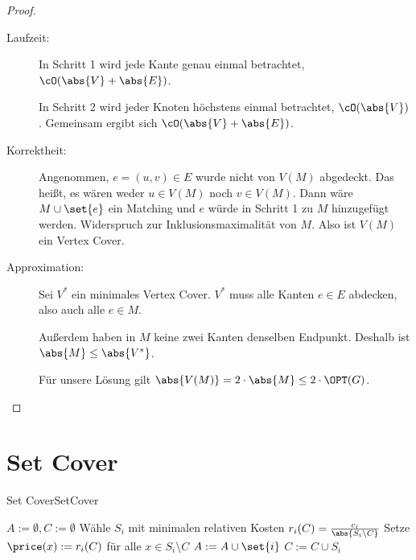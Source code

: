 \documentclass[language=ngerman,algolist]{TemplateLecture}
\begin{document}
\begin{proof}
    \begin{description}
        \item[Laufzeit:] In Schritt 1 wird jede Kante genau einmal betrachtet, $\cO(\abs{V} + \abs{E})$. 
        
        In Schritt 2 wird jeder Knoten höchstens einmal betrachtet, $\cO(\abs{V})$. Gemeinsam ergibt sich $\cO(\abs{V} + \abs{E})$.
        \item[Korrektheit:] Angenommen, $e = (u,v) \in E$ wurde nicht von $V(M)$ abgedeckt. Das heißt, es wären weder $u \in V(M)$ noch $v \in V(M)$. Dann wäre $M \cup \set{e}$ ein Matching und $e$ würde in Schritt 1 zu $M$ hinzugefügt werden. Widerspruch zur Inklusionsmaximalität von $M$. Also ist $V(M)$ ein Vertex Cover.
        \item[Approximation:] Sei $V^*$ ein minimales Vertex Cover. $V^*$ muss alle Kanten $e \in E$ abdecken, also auch alle $e \in M$. 
        
        Außerdem haben in $M$ keine zwei Kanten denselben Endpunkt. Deshalb ist $\abs{M} \leq \abs{V^*}$. 
        
        Für unsere Lösung gilt $\abs{V(M)} = 2 \cdot \abs{M} \leq 2 \cdot \OPT(G)$.
    \end{description}
\end{proof}

\section{Set Cover}\label{sec:SetCover}

\begin{prob}{Set Cover}{SetCover}
\end{prob}


\begin{algorithm}[h] %
    \caption{\textsc{Greedy-SC}}\label{alg:greedySC}
    \begin{algorithmic}[1]
        \State{} $A := \emptyset, C := \emptyset$
            \State{} Wähle $S_i$ mit minimalen relativen Kosten $r_i(C) = \frac{c_i}{\abs{S_i \setminus C}}$
            \State{} Setze $\price(x) := r_i(C)$ für alle $x \in S_i \setminus C$
            \State{} $A := A \cup \set{i}$
            \State{} $C := C \cup S_i$
        \EndWhile{}
        \State{} 
    \end{algorithmic}
\end{algorithm}
\end{document}
